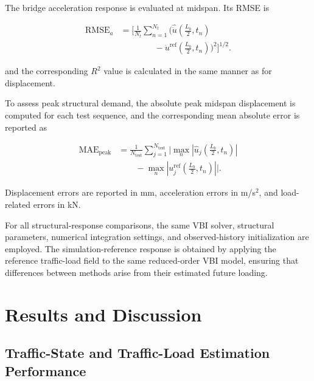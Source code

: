\documentclass[journal]{IEEEtran}
\begin{document}
The
bridge acceleration response is evaluated at midspan. Its RMSE is

\begin{equation}
\begin{aligned}
\mathrm{RMSE}_{a}
&=
\Bigg[
\frac{1}{N_t}
\sum_{n=1}^{N_t}
\Bigg(
\widehat{\ddot{u}}
\left(
\frac{L_b}{2},t_n
\right)
\\
&\qquad\qquad
-
\ddot{u}^{\mathrm{ref}}
\left(
\frac{L_b}{2},t_n
\right)
\Bigg)^2
\Bigg]^{1/2}.
\end{aligned}
\end{equation}

and
the corresponding $R^2$ value is calculated in
the same manner as for displacement.

To
assess peak structural demand, the absolute peak midspan displacement is
computed for each test sequence, and the corresponding mean absolute error is
reported as

\begin{equation}
\begin{aligned}
\mathrm{MAE}_{\mathrm{peak}}
&=
\frac{1}{N_{\mathrm{test}}}
\sum_{j=1}^{N_{\mathrm{test}}}
\Bigg|
\max_{n}
\left|
\widehat{u}_{j}
\left(
\frac{L_b}{2},t_n
\right)
\right|
\\
&\qquad
-
\max_{n}
\left|
u_{j}^{\mathrm{ref}}
\left(
\frac{L_b}{2},t_n
\right)
\right|
\Bigg|.
\end{aligned}
\end{equation}

Displacement
errors are reported in mm, acceleration errors in m/s$^2$, and load-related errors
in kN.

For all structural-response comparisons, the same VBI solver, structural parameters, numerical integration settings, and observed-history initialization are employed. The simulation-reference response is obtained by applying the reference traffic-load field to the same reduced-order VBI model, ensuring that differences between methods arise from their estimated future loading.





\section{Results and Discussion}

\subsection{Traffic-State and Traffic-Load Estimation Performance}
\label{sec:traffic_results}
\end{document}
